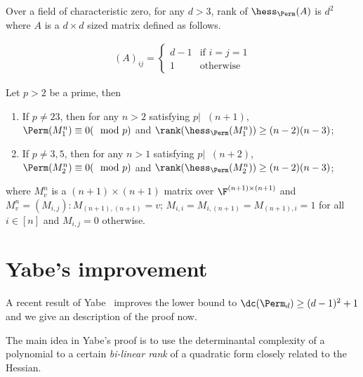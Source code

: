 \begin{theorem}[\cite{mr04}]
	Over a field of characteristic zero, for any $d>3$, rank of $\hess_{\Perm}(A)$ is $d^2$ where $A$ is a $d\times d$ sized matrix defined as follows.
	
	\begin{align*}
		(A)_{ij} = \begin{cases}
			d-1& \mbox{if $i=j=1$}\\
			1& \mbox{otherwise}
		\end{cases}
	\end{align*}
\end{theorem}

\begin{theorem}
	Let $p > 2$ be a prime, then
	\begin{enumerate}
		\item If $p \neq 23$, then for any $n > 2$ satisfying $p\lvert 􏰄􏰄(n+1)$, $\Perm(M^n_1) \equiv 0 (\mod p)$ and $\rank(\hess_{\Perm}(M^n_1)) \geq (n-2)(n-3)$;
		\item If $p \neq 3, 5$, then for any $n > 1$ satisfying $p\lvert􏰄􏰄(n + 2)$, $\Perm(M^n_2) \equiv 0 (\mod p)$ and $\rank(\hess_{\Perm}(M^n_2)) \geq (n-2)(n-3)$;
	\end{enumerate}
	
	where $M^n_v$ is a $(n+1)\times(n+1)$ matrix over $\F^{(n+1)\times(n+1)}$ and $M^n_v = (M_{i,j}) : M_{(n+1),(n+1)} = v$; $M_{i,i} = M_{i,(n+1)} = M_{(n+1),i} = 1$ for all $i\in[n]$ and $M_{i,j}=0$ otherwise.
	
\end{theorem}


\section{Yabe's improvement~\cite{Yabe15}}

A recent result of Yabe~\cite{Yabe15} improves the lower bound to $\dc(\Perm_d) \geq (d-1)^2 + 1$ and we give an description of the proof now. 

The main idea in Yabe's proof is to use the determinantal complexity of a polynomial to a certain \emph{bi-linear rank} of a quadratic form closely related to the Hessian. 

